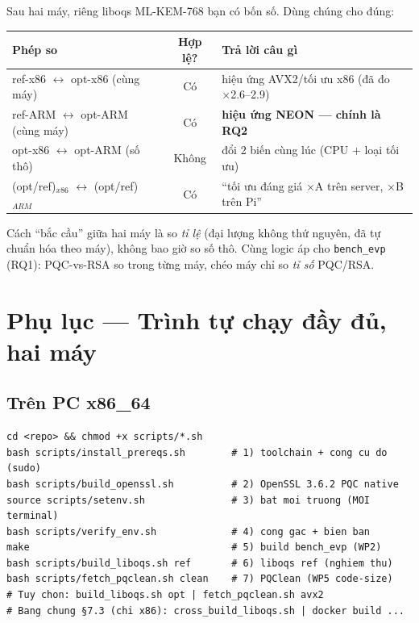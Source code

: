 \documentclass[11pt,a4paper]{article}
\begin{document}
Sau hai máy, riêng liboqs ML-KEM-768 bạn có bốn số. Dùng chúng cho đúng:

\begin{center}\small
\begin{tabularx}{\linewidth}{@{}l c X@{}}
\toprule
\textbf{Phép so} & \textbf{Hợp lệ?} & \textbf{Trả lời câu gì} \\
\midrule
ref-x86 $\leftrightarrow$ opt-x86 (cùng máy) & Có & hiệu ứng AVX2/tối ưu x86 (đã đo ×2.6–2.9) \\
ref-ARM $\leftrightarrow$ opt-ARM (cùng máy) & Có & \textbf{hiệu ứng NEON — chính là RQ2} \\
opt-x86 $\leftrightarrow$ opt-ARM (số thô) & Không & đổi 2 biến cùng lúc (CPU + loại tối ưu) \\
(opt/ref)$_{x86}$ $\leftrightarrow$ (opt/ref)$_{ARM}$ & Có & ``tối ưu đáng giá ×A trên server, ×B trên Pi'' \\
\bottomrule
\end{tabularx}
\end{center}

Cách ``bắc cầu'' giữa hai máy là so \emph{tỉ lệ} (đại lượng không thứ nguyên, đã tự chuẩn hóa theo máy), không bao giờ so số thô. Cùng logic áp cho \verb|bench_evp| (RQ1): PQC-vs-RSA so trong từng máy, chéo máy chỉ so \emph{tỉ số} PQC/RSA.

\section{Phụ lục — Trình tự chạy đầy đủ, hai máy}

\subsection*{Trên PC x86\_64}
\begin{lstlisting}
cd <repo> && chmod +x scripts/*.sh
bash scripts/install_prereqs.sh        # 1) toolchain + cong cu do (sudo)
bash scripts/build_openssl.sh          # 2) OpenSSL 3.6.2 PQC native
source scripts/setenv.sh               # 3) bat moi truong (MOI terminal)
bash scripts/verify_env.sh             # 4) cong gac + bien ban
make                                   # 5) build bench_evp (WP2)
bash scripts/build_liboqs.sh ref       # 6) liboqs ref (nghiem thu)
bash scripts/fetch_pqclean.sh clean    # 7) PQClean (WP5 code-size)
# Tuy chon: build_liboqs.sh opt | fetch_pqclean.sh avx2
# Bang chung §7.3 (chi x86): cross_build_liboqs.sh | docker build ...
\end{lstlisting}
\end{document}
